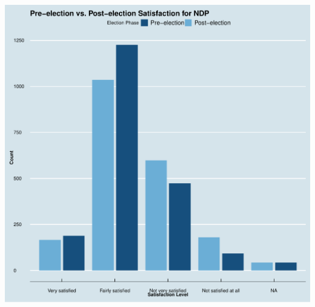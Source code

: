 \documentclass{beamer}
\begin{document}
\begin{frame}
\begin{center}
\begin{minipage}{0.48\textwidth}
            \includegraphics[width=\textwidth]{Pre-election vs. Post-election Satisfaction for NDP.pdf}
        \end{minipage}
    \end{center}
\end{frame}
\end{document}
